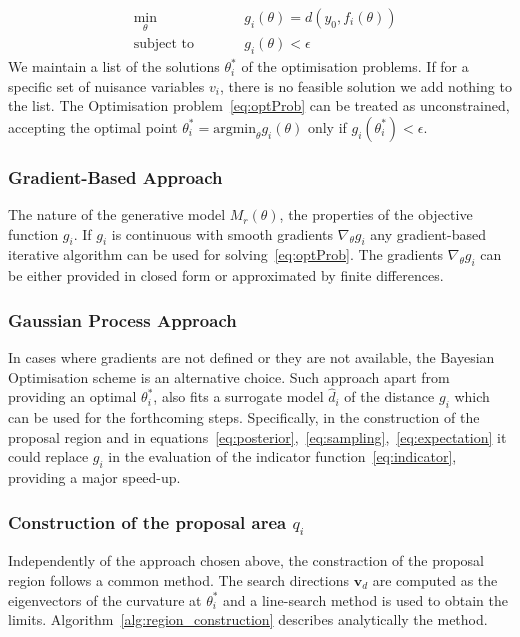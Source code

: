 \begin{subequations}
\begin{alignat}{2}
&\!\min_{\theta}        &\qquad& g_i(\theta) = d(y_0,  f_i(\theta))\label{eq:optProb}\\
&\text{subject to} &      & g_i(\theta) < \epsilon
\end{alignat}
\end{subequations}
%
We maintain a list of the solutions $\theta_i^*$ of the optimisation problems. If for a specific set of nuisance variables $v_i$, there is no feasible solution we add nothing to the list. The Optimisation problem~\ref{eq:optProb} can be treated as unconstrained, accepting the optimal point $\theta_i^* = \text{argmin}_\theta g_i(\theta)$ only if $g_i(\theta_i^*) < \epsilon$.

\subsubsection{Gradient-Based Approach}
\label{subsubsec:GB_approach}

The nature of the generative model $M_r(\theta)$, the properties of the objective function $g_i$. If $g_i$ is continuous with smooth gradients $\nabla_{\theta} g_i$ any gradient-based iterative algorithm can be used for solving~\ref{eq:optProb}. The gradients $\nabla_{\theta} g_i$ can be either provided in closed form or approximated by finite differences.

\subsubsection{Gaussian Process Approach}
\label{subsubsec:GP_approach}

In cases where gradients are not defined or they are not available, the Bayesian Optimisation scheme is an alternative choice. Such approach apart from providing an optimal $\theta_i^* $, also fits a surrogate model $\hat{d}_i$ of the distance $g_i$ which can be used for the forthcoming steps. Specifically, in the construction of the proposal region and in equations~\ref{eq:posterior},~\ref{eq:sampling},~\ref{eq:expectation} it could replace $g_i$ in the evaluation of the indicator function~\ref{eq:indicator}, providing a major speed-up.

\subsubsection{Construction of the proposal area $q_i$}

Independently of the approach chosen above, the constraction of the proposal region follows a common method. The search directions $\mathbf{v}_d$ are computed as the eigenvectors of the curvature at $\theta_i^*$ and a line-search method is used to obtain the limits. Algorithm~\ref{alg:region_construction} describes analytically the method.
